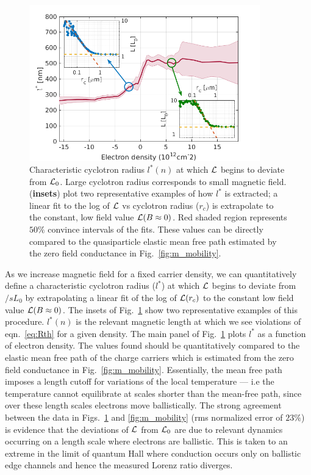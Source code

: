 \begin{figure}
\centering
\includegraphics[width=100mm]{figures/magneto/r_cyc.png}
\caption{Characteristic cyclotron radius $l^*(n)$ at which $\mathcal{L}$ begins to deviate from $\mathcal{L}_0$. Large cyclotron radius corresponds to small magnetic field. (\textbf{insets}) plot two representative examples of how $l^*$ is extracted; a linear fit to the log of $\mathcal{L}$ vs cyclotron radius ($r_c$) is extrapolate to the constant, low field value $\mathcal{L}(B\approx0)$. Red shaded region represents $50\%$ convince intervals of the fits. These values can be directly compared to the quasiparticle elastic mean free path estimated by the zero field conductance in Fig.~\ref{fig:m_mobility}.}
\label{fig:m_cyc}
\end{figure}
As we increase magnetic field for a fixed carrier density, we can quantitatively define a characteristic cyclotron radius ($l^*$) at which $\mathcal{L}$ begins to deviate from $/sL_0$ by extrapolating a linear fit of the log of $\mathcal{L}(r_c)$ to the constant low field value $\mathcal{L}(B\approx0)$. The insets of Fig.~\ref{fig:m_cyc} show two representative examples of this procedure. $l^*(n)$ is the relevant magnetic length at which we see violations of eqn.~\ref{eq:Rth} for a given density. The main panel of Fig.~\ref{fig:m_cyc} plots $l^*$ as a function of electron density. The values found should be quantitatively compared to the elastic mean free path of the charge carriers which is estimated from the zero field conductance in Fig.~\ref{fig:m_mobility}. Essentially, the mean free path imposes a length cutoff for variations of the local temperature --- i.e the temperature cannot equilibrate at scales shorter than the mean-free path, since over these length scales electrons move ballistically. The strong agreement between the data in Figs.~\ref{fig:m_cyc} and \ref{fig:m_mobility} (rms normalized error of $23\%$) is evidence that the deviations of $\mathcal{L}$ from $\mathcal{L}_0$ are due to relevant dynamics occurring on a length scale where electrons are ballistic. This is taken to an extreme in the limit of quantum Hall where conduction occurs only on ballistic edge channels and hence the measured Lorenz ratio diverges.

